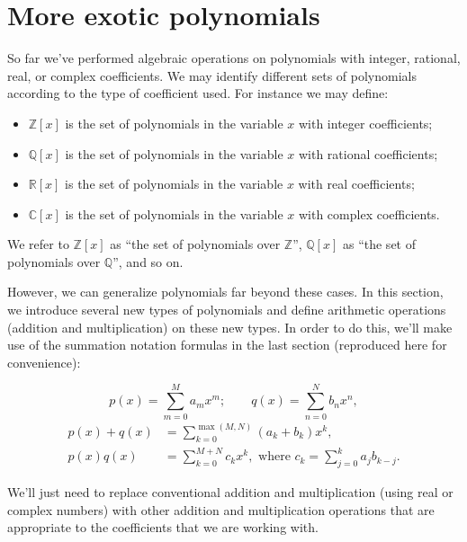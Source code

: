 \section{More exotic polynomials}\label{exoticPolynomials}

So far we've performed algebraic operations on polynomials with integer, rational, real, or complex coefficients. We may identify different sets of polynomials according to the type of coefficient used. For instance we may define:
\begin{itemize}
\item
$\mathbb{Z}[x]$ is the set of polynomials in the variable $x$ with integer coefficients;
\item
$\mathbb{Q}[x]$ is the set of polynomials in the variable $x$ with rational coefficients;
\item
$\mathbb{R}[x]$ is the set of polynomials in the variable $x$ with real coefficients;
\item
$\mathbb{C}[x]$ is the set of polynomials in the variable $x$ with complex coefficients.
\end{itemize}

We refer to $\mathbb{Z}[x]$ as ``the set of polynomials over $\mathbb{Z}$'', $\mathbb{Q}[x]$ as ``the set of polynomials over $\mathbb{Q}$'', and so on.

However, we can generalize polynomials far beyond these cases. In this section, we introduce several new types of polynomials and define arithmetic operations (addition and multiplication) on these new types. In order to do this, we'll make use of the summation notation formulas in the last section (reproduced here for convenience):

\[
p(x)  = \sum^{M}_{m=0} a_m x^m ; \qquad
q(x)  = \sum^{N}_{n=0} b_n x^n,
\]
\begin{align*}
p(x) + q(x) &=  \sum_{k=0}^{\max(M,N)} (a_k + b_k) x^k, \\
p(x) q(x) &= \sum_{k=0}^{M+N} c_k x^k,
\text{ where }
c_k=  \sum_{j = 0}^k a_j b_{k - j}.
\end{align*}
 

We'll just need to replace conventional addition and multiplication (using real or complex numbers) with other addition and multiplication operations that are appropriate to the coefficients that we are working with.  

